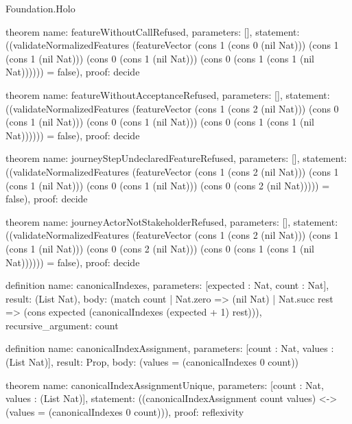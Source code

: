\begin{lexlean}{Foundation.Holo}
\begin{semanticmodule}
theorem{
  name: featureWithoutCallRefused,
  parameters: [],
  statement: ((validateNormalizedFeatures (featureVector (cons 1 (cons 0 (nil Nat))) (cons 1 (cons 1 (nil Nat))) (cons 0 (cons 1 (nil Nat))) (cons 0 (cons 1 (cons 1 (nil Nat)))))) = false),
  proof: decide{}
}

theorem{
  name: featureWithoutAcceptanceRefused,
  parameters: [],
  statement: ((validateNormalizedFeatures (featureVector (cons 1 (cons 2 (nil Nat))) (cons 0 (cons 1 (nil Nat))) (cons 0 (cons 1 (nil Nat))) (cons 0 (cons 1 (cons 1 (nil Nat)))))) = false),
  proof: decide{}
}

theorem{
  name: journeyStepUndeclaredFeatureRefused,
  parameters: [],
  statement: ((validateNormalizedFeatures (featureVector (cons 1 (cons 2 (nil Nat))) (cons 1 (cons 1 (nil Nat))) (cons 0 (cons 1 (nil Nat))) (cons 0 (cons 2 (nil Nat))))) = false),
  proof: decide{}
}

theorem{
  name: journeyActorNotStakeholderRefused,
  parameters: [],
  statement: ((validateNormalizedFeatures (featureVector (cons 1 (cons 2 (nil Nat))) (cons 1 (cons 1 (nil Nat))) (cons 0 (cons 2 (nil Nat))) (cons 0 (cons 1 (cons 1 (nil Nat)))))) = false),
  proof: decide{}
}

definition{
  name: canonicalIndexes,
  parameters: [expected : Nat, count : Nat],
  result: (List Nat),
  body: (match count
    | Nat.zero => (nil Nat)
    | Nat.succ rest => (cons expected (canonicalIndexes (expected + 1) rest))),
  recursive_argument: count
}

definition{
  name: canonicalIndexAssignment,
  parameters: [count : Nat, values : (List Nat)],
  result: Prop,
  body: (values = (canonicalIndexes 0 count))
}

theorem{
  name: canonicalIndexAssignmentUnique,
  parameters: [count : Nat, values : (List Nat)],
  statement: ((canonicalIndexAssignment count values) <-> (values = (canonicalIndexes 0 count))),
  proof: reflexivity{}
}
\end{semanticmodule}
\end{lexlean}
